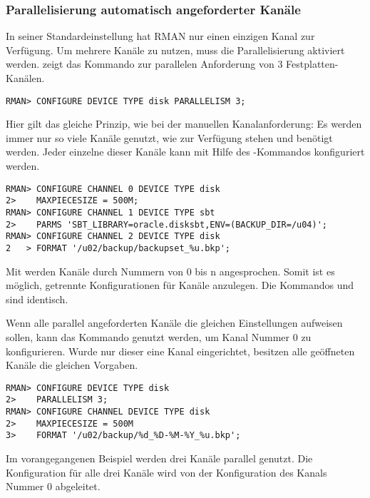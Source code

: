         \subsubsection{Parallelisierung automatisch angeforderter Kanäle}
          In seiner Standardeinstellung hat RMAN nur einen einzigen Kanal zur Verfügung. Um mehrere Kanäle zu nutzen, muss die Parallelisierung aktiviert werden.  zeigt das Kommando zur parallelen Anforderung von 3 Festplatten-Kanälen.
          \begin{lstlisting}[caption={Parallelisierung von Kanälen},label=admin1019,language=rman]
RMAN> CONFIGURE DEVICE TYPE disk PARALLELISM 3;
          \end{lstlisting}
          Hier gilt das gleiche Prinzip, wie bei der manuellen Kanalanforderung: Es werden immer nur so viele Kanäle genutzt, wie zur Verfügung stehen und benötigt werden. Jeder einzelne dieser Kanäle kann mit Hilfe des -Kommandos konfiguriert werden.
          \begin{lstlisting}[caption={Unterschiedliche Kanäle vordefinieren},label=admin1020,language=rman]
RMAN> CONFIGURE CHANNEL 0 DEVICE TYPE disk
2>    MAXPIECESIZE = 500M;
RMAN> CONFIGURE CHANNEL 1 DEVICE TYPE sbt
2>    PARMS 'SBT_LIBRARY=oracle.disksbt,ENV=(BACKUP_DIR=/u04)';
RMAN> CONFIGURE CHANNEL 2 DEVICE TYPE disk
2   > FORMAT '/u02/backup/backupset_%u.bkp';
          \end{lstlisting}
          \begin{merke}
            Mit  werden Kanäle durch Nummern von 0 bis n angesprochen. Somit ist es möglich, getrennte Konfigurationen für Kanäle anzulegen. Die Kommandos  und  sind identisch.
          \end{merke}
          Wenn alle parallel angeforderten Kanäle die gleichen Einstellungen aufweisen sollen, kann das Kommando  genutzt werden, um Kanal Nummer 0 zu konfigurieren. Wurde nur dieser eine Kanal eingerichtet, besitzen alle geöffneten Kanäle die gleichen Vorgaben.
          \begin{lstlisting}[caption={Parallele Anforderung von Kanälen mit gleicher Konfiguration},label=admin1021,language=rman]
RMAN> CONFIGURE DEVICE TYPE disk
2>    PARALLELISM 3;
RMAN> CONFIGURE CHANNEL DEVICE TYPE disk
2>    MAXPIECESIZE = 500M
3>    FORMAT '/u02/backup/%d_%D-%M-%Y_%u.bkp';
          \end{lstlisting}
          Im vorangegangenen Beispiel werden drei Kanäle parallel genutzt. Die Konfiguration für alle drei Kanäle wird von der Konfiguration des Kanals Nummer 0 abgeleitet.
